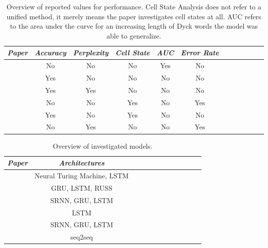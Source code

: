 \begin{table}
	\begin{tabularx}{\textwidth}{@{}l*{10}{C}c@{}}
	\toprule 
	\textit{Paper} & \textit{Accuracy} & \textit{Perplexity} & \textit{Cell State} & \textit{AUC} & \textit{Error Rate} \\
	\toprule
	\cite{Deleu2016} & No & No & No & Yes & No \\
	\cite{Bernardy2018} & Yes & No & No & No & No \\
	\cite{Skachkova2018} & Yes & Yes & No & No & No \\
	\cite{Sennhauser2018} & No & No & Yes & No & Yes \\
	\cite{Suzgun2019} & Yes & No & Yes & No & No\\
	\cite{Yu2019} & No & Yes & No & No & Yes \\ 
	\bottomrule
	\end{tabularx} 
	\caption[Reported values for performance in previous works]{Overview of reported values for performance. Cell State Analysis does not refer to a unified method, it merely means the paper investigates cell states at all. AUC refers to the area under the curve for an increasing length of Dyck words the model was able to generalize.}
	\label{tab:LiteratureReportedMeasures}
\end{table}
\begin{table}
	\begin{tabularx}{\textwidth}{@{}l*{10}{C}c@{}}
	\toprule 
	\textit{Paper} & \textit{Architectures} \\
	\toprule 
	\cite{Deleu2016} & Neural Turing Machine, LSTM \\
	\cite{Bernardy2018} & GRU, LSTM, RUSS \\
	\cite{Skachkova2018} & SRNN, GRU, LSTM \\
	\cite{Sennhauser2018} & LSTM \\
	\cite{Suzgun2019} & SRNN, GRU, LSTM \\
	\cite{Yu2019} & seq2seq \\ 
	\bottomrule
	\end{tabularx}
	\caption[Overview of investigated models]{Overview of investigated models.}
	\label{tab:LiteratureInvestigatedModels}
\end{table} 

